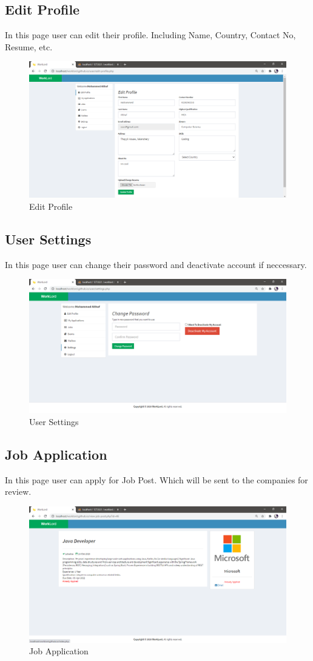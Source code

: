 \documentclass[a4paper,12pt]{report}
\begin{document}
\pagebreak

\subsection {Edit Profile}
In this page user can edit their profile. Including Name, Country, Contact No, Resume, etc.
\begin{figure}[bph]
	\centering
	\includegraphics[width=.7\linewidth ]{img/screenshots/user/user_prof_Edit}
	\caption{Edit Profile}
\end{figure}

\subsection {User Settings}
In this page user can change their password and deactivate account if neccessary.
\begin{figure}[bph]
	\centering
	\includegraphics[width=.7\linewidth ]{img/screenshots/user/settings}
	\caption{User Settings}
\end{figure}

\pagebreak

\subsection {Job Application}
In this page user can apply for Job Post. Which will be sent to the companies for review.
\begin{figure}[bph]
	\centering
	\includegraphics[width=.7\linewidth ]{img/screenshots/user/job_appl_pre}
	\caption{Job Application}
\end{figure}
\end{document}
